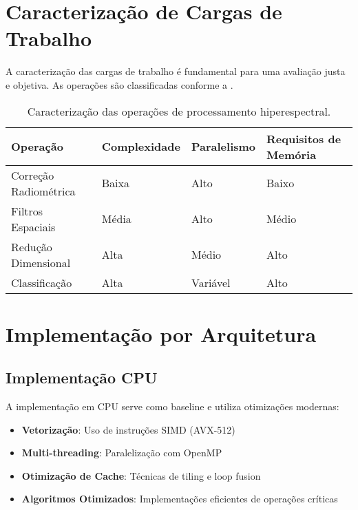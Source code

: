 \section{Caracterização de Cargas de Trabalho}\label{sec:caracterizacao}

A caracterização das cargas de trabalho é fundamental para uma avaliação justa e objetiva. As operações são classificadas conforme a .

\begin{table}[!htp]
\caption[Caracterização de Operações]{Caracterização das operações de processamento hiperespectral.}
\label{tab:caracterizacao}
\begin{center}
\begin{tabular}{|p{3cm}|p{3cm}|p{3cm}|p{3cm}|}
\hline
\textbf{Operação} & \textbf{Complexidade} & \textbf{Paralelismo} & \textbf{Requisitos de Memória} \\
\hline
Correção Radiométrica & Baixa & Alto & Baixo \\
\hline
Filtros Espaciais & Média & Alto & Médio \\
\hline
Redução Dimensional & Alta & Médio & Alto \\
\hline
Classificação & Alta & Variável & Alto \\
\hline
\end{tabular}
\end{center}
\end{table}

\section{Implementação por Arquitetura}\label{sec:implementacao}

\subsection{Implementação CPU}
A implementação em CPU serve como baseline e utiliza otimizações modernas:

\begin{itemize}
    \item \textbf{Vetorização}: Uso de instruções SIMD (AVX-512)
    \item \textbf{Multi-threading}: Paralelização com OpenMP
    \item \textbf{Otimização de Cache}: Técnicas de tiling e loop fusion
    \item \textbf{Algoritmos Otimizados}: Implementações eficientes de operações críticas
\end{itemize}

